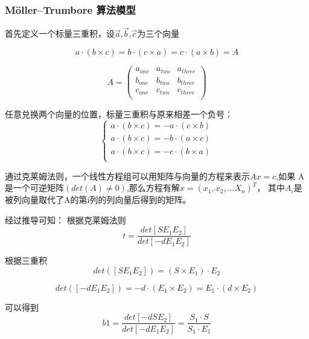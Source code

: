 \documentclass{数学建模}
\begin{document}
\subsubsection{Möller–Trumbore 算法模型}
首先定义一个标量三重积，设$\overrightarrow{a} $,$\overrightarrow{b} $,$\overrightarrow{c} $为三个向量

\begin{equation}
    a\cdot (b\times c) = b\cdot (c\times a) = c\cdot (a\times b) = A
\end{equation}


\begin{equation}
    A = \begin{pmatrix}
        a_{one} & a_{two} & a_{three} \\
        b_{one} & b_{two} & b_{three} \\
        c_{one} & c_{two} & c_{three} \\
    \end{pmatrix}
\end{equation}

任意兑换两个向量的位置，标量三重积与原来相差一个负号：
\begin{equation}
    \begin{cases}
    a\cdot (b\times c) = -a\cdot (c\times b)\\
    a\cdot (b\times c) = -b\cdot (a\times c)\\
    a\cdot (b\times c) = -c\cdot (b\times a)\\
    \end{cases}
\end{equation}

通过克莱姆法则，一个线性方程组可以用矩阵与向量的方程来表示$Ax=c$,如果
A是一个可逆矩阵$(det(A)\neq 0)$,那么方程有解$x=(x_1,x_2,\dots X_n)^T$，
其中$A_i$是被列向量取代了A的第i列的列向量后得到的矩阵。

经过推导可知：
根据克莱姆法则
\begin{equation}
    t = \frac{det[S E_1 E_2]}{det[-d E_1 E_2]} 
\end{equation}

根据三重积
\begin{equation}
    det([S E_1 E_2]) = (S\times E_1)\cdot E_2
\end{equation}

\begin{equation}
    det([-d E_1 E_2]) = -d \cdot (E_1\times E_2) =  E_1\cdot(d\times E_2)
\end{equation}

可以得到
\begin{equation}
    b1 = \frac{det[-d S E_2]}{det[-d E_1 E_2]} = \frac{S_1\cdot S}{S_1\cdot E_1}
\end{equation}
\end{document}
